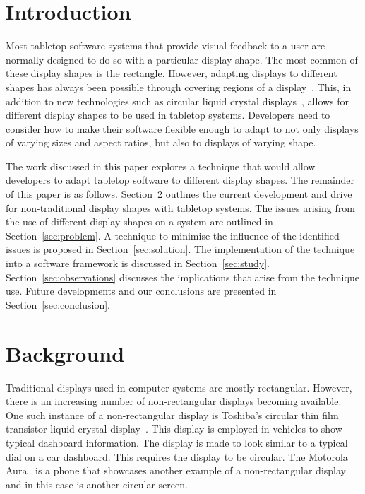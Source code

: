 \documentclass[review,5p,times,twocolumn]{elsarticle}
\begin{document}
\section{Introduction}
\label{sec:intro}

Most tabletop software systems that provide visual feedback to a user are normally designed to do so with a particular display shape.
The most common of these display shapes is the rectangle.
However, adapting displays to different shapes has always been possible through covering regions of a display~\cite{Dietz2004}.
This, in addition to new technologies such as circular liquid crystal displays~\cite{Boyd2007,Finney2009}, allows for different display shapes to be used in tabletop systems. 
Developers need to consider how to make their software flexible enough to adapt to not only displays of varying sizes and aspect ratios, but also to displays of varying shape.

The work discussed in this paper explores a technique that would allow developers to adapt tabletop software to different display shapes.
The remainder of this paper is as follows. 
Section~\ref{sec:related} outlines the current development and drive for non-traditional display shapes with tabletop systems. 
The issues arising from the use of different display shapes on a system are outlined in Section~\ref{sec:problem}.
A technique to minimise the influence of the identified issues is proposed in Section~\ref{sec:solution}.
The implementation of the technique into a software framework is discussed in Section~\ref{sec:study}.
Section~\ref{sec:observations} discusses the implications that arise from the technique use.
Future developments and our conclusions are presented in Section~\ref{sec:conclusion}.

\section{Background}
\label{sec:related}

Traditional displays used in computer systems are mostly rectangular.
However, there is an increasing number of non-rectangular displays becoming available.
One such instance of a non-rectangular display is Toshiba's circular thin film transistor liquid crystal display~\cite{Boyd2007}.
This display is employed in vehicles to show typical dashboard information.
The display is made to look similar to a typical dial on a car dashboard.
This requires the display to be circular.
The Motorola Aura~\cite{Finney2009} is a phone that showcases another example of a non-rectangular display and in this case is another circular screen.
\end{document}
